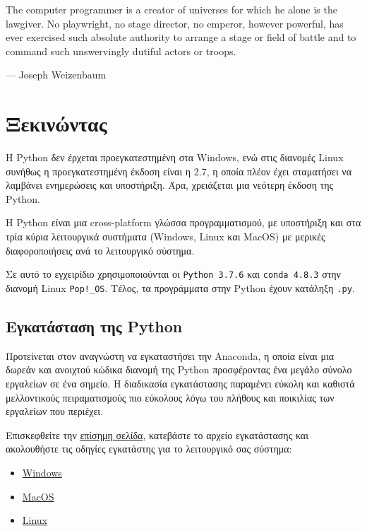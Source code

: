 \documentclass[14pt]{extreport}
\begin{document}
\epigraph{The computer programmer is a creator of universes for which he alone is the lawgiver. No playwright, no stage director, no emperor, however powerful, has ever exercised such absolute authority to arrange a stage or field of battle and to command such unswervingly dutiful actors or troops.}{--- Joseph Weizenbaum}

\newpage

\section{Ξεκινώντας}

Η Python δεν έρχεται προεγκατεστημένη στα Windows, ενώ στις διανομές Linux συνήθως η προεγκατεστημένη έκδοση είναι η 2.7, η οποία πλέον έχει σταματήσει να λαμβάνει ενημερώσεις και υποστήριξη. Άρα, χρειάζεται μια νεότερη έκδοση της  Python.

Η Python είναι μια cross-platform γλώσσα προγραμματισμού, με υποστήριξη και στα τρία κύρια λειτουργικά συστήματα (Windows, Linux και MacOS) με μερικές διαφοροποιήσεις ανά το λειτουργικό σύστημα.

Σε αυτό το εγχειρίδιο χρησιμοποιούνται οι \lstinline{Python 3.7.6} και \lstinline{conda 4.8.3} στην διανομή Linux \lstinline{Pop!_OS}. Τέλος, τα προγράμματα στην Python έχουν κατάληξη \lstinline{.py}.

\subsection{Εγκατάσταση της Python}
Προτείνεται στον αναγνώστη να εγκαταστήσει την Anaconda, η οποία είναι μια δωρεάν και  ανοιχτού κώδικα διανομή της Python προσφέροντας ένα μεγάλο σύνολο εργαλείων σε ένα σημείο. Η διαδικασία εγκατάστασης παραμένει εύκολη και καθιστά μελλοντικούς πειραματισμούς πιο εύκολους λόγω του πλήθους και ποικιλίας των εργαλείων που περιέχει.

Επισκεφθείτε την \href{https://www.anaconda.com/products/individual#Downloads}{επίσημη σελίδα}, κατεβάστε το αρχείο εγκατάστασης και ακολουθήστε τις οδηγίες εγκατάστης για το λειτουργικό σας σύστημα:

\begin{itemize}\itemsep0cm
    \item \href{https://docs.anaconda.com/anaconda/install/windows/}{Windows}
    \item \href{https://docs.anaconda.com/anaconda/install/mac-os/}{MacOS}
    \item \href{https://docs.anaconda.com/anaconda/install/linux/}{Linux}
\end{itemize}
\end{document}
